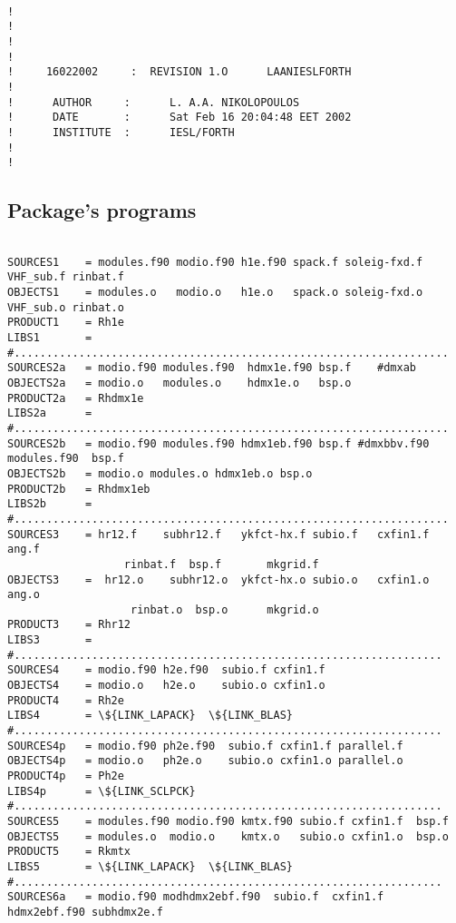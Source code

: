 \begin{verbatim}

!
!   
!
!
!     16022002     :  REVISION 1.O      LAANIESLFORTH
!
!      AUTHOR     :      L. A.A. NIKOLOPOULOS   
!      DATE       :      Sat Feb 16 20:04:48 EET 2002
!      INSTITUTE  :      IESL/FORTH 
!
!

\end{verbatim}

\subsection{Package's programs}

\begin{verbatim}

SOURCES1	= modules.f90 modio.f90 h1e.f90 spack.f soleig-fxd.f VHF_sub.f rinbat.f
OBJECTS1	= modules.o   modio.o   h1e.o   spack.o soleig-fxd.o VHF_sub.o rinbat.o
PRODUCT1 	= Rh1e
LIBS1    	=
#...................................................................
SOURCES2a	= modio.f90 modules.f90  hdmx1e.f90 bsp.f    #dmxab
OBJECTS2a	= modio.o   modules.o    hdmx1e.o   bsp.o
PRODUCT2a	= Rhdmx1e
LIBS2a   	=
#...................................................................
SOURCES2b	= modio.f90 modules.f90 hdmx1eb.f90 bsp.f #dmxbbv.f90 modules.f90  bsp.f
OBJECTS2b	= modio.o modules.o hdmx1eb.o bsp.o  
PRODUCT2b	= Rhdmx1eb
LIBS2b   	=
#...................................................................
SOURCES3	= hr12.f    subhr12.f   ykfct-hx.f subio.f   cxfin1.f    ang.f    
                  rinbat.f  bsp.f       mkgrid.f 
OBJECTS3	=  hr12.o    subhr12.o  ykfct-hx.o subio.o   cxfin1.o   ang.o      
                   rinbat.o  bsp.o      mkgrid.o 
PRODUCT3	= Rhr12
LIBS3   	= 
#..................................................................
SOURCES4	= modio.f90 h2e.f90  subio.f cxfin1.f
OBJECTS4	= modio.o   h2e.o    subio.o cxfin1.o 
PRODUCT4	= Rh2e 
LIBS4   	= \${LINK_LAPACK}  \${LINK_BLAS}  
#..................................................................
SOURCES4p	= modio.f90 ph2e.f90  subio.f cxfin1.f parallel.f
OBJECTS4p	= modio.o   ph2e.o    subio.o cxfin1.o parallel.o
PRODUCT4p	= Ph2e
LIBS4p   	= \${LINK_SCLPCK}
#..................................................................
SOURCES5	= modules.f90 modio.f90 kmtx.f90 subio.f cxfin1.f  bsp.f
OBJECTS5	= modules.o  modio.o    kmtx.o   subio.o cxfin1.o  bsp.o 
PRODUCT5	= Rkmtx
LIBS5   	= \${LINK_LAPACK}  \${LINK_BLAS}
#..................................................................
SOURCES6a	= modio.f90 modhdmx2ebf.f90  subio.f  cxfin1.f hdmx2ebf.f90 subhdmx2e.f

\end{verbatim}
